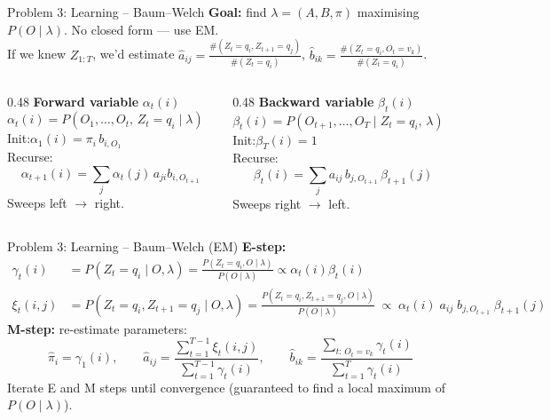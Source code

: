 \documentclass[aspectratio=169,t]{beamer}
\begin{document}
\begin{frame}{Problem 3: Learning -- Baum--Welch}
  \textbf{Goal:} find $\lambda=(A,B,\pi)$ maximising $P(O\mid\lambda)$. No closed form — use EM.\\[0.1cm]
  If we knew $Z_{1:T}$, we'd estimate
  $\hat a_{ij} = \frac{\#(Z_t{=}q_i, Z_{t+1}{=}q_j)}{\#(Z_t{=}q_i)}$,\;
  $\hat b_{ik} = \frac{\#(Z_t{=}q_i, O_t{=}v_k)}{\#(Z_t{=}q_i)}$.\\[0.3cm]
  \begin{columns}[T]
    \begin{column}{0.48\textwidth}
      \textbf{Forward variable} $\alpha_t(i)$\\[0.1cm]
      $\alpha_t(i) = P(O_1,\ldots,O_t,\, Z_t{=}q_i \mid \lambda)$\\[0.2cm]
      Init:\quad $\alpha_1(i)=\pi_i\,b_{i,O_1}$\\[0.15cm]
      Recurse:
      $$\alpha_{t+1}(i)=\sum_j \alpha_t(j)\, a_{ji} b_{i,O_{t+1}}$$
      Sweeps left $\to$ right.
    \end{column}
    \begin{column}{0.48\textwidth}
      \textbf{Backward variable} $\beta_t(i)$\\[0.1cm]
      $\beta_t(i) = P(O_{t+1},\ldots,O_T \mid Z_t{=}q_i,\,\lambda)$\\[0.2cm]
      Init:\quad $\beta_T(i)=1$\\[0.15cm]
      Recurse:
      $$\beta_t(i)=\sum_j a_{ij}\,b_{j,O_{t+1}}\,\beta_{t+1}(j)$$
      Sweeps right $\to$ left.
    \end{column}
  \end{columns}
\end{frame}

\begin{frame}[shrink=3]{Problem 3: Learning -- Baum--Welch (EM)}
    \textbf{E-step:}
    \begin{align*}
      \gamma_t(i) &= P(Z_t = q_i \mid O,\lambda) = \frac{P(Z_t = q_i, O \mid \lambda)}{P(O \mid \lambda)}
      \propto \alpha_t(i) \beta_t(i)\\[4pt]
      \xi_t(i,j)  &= P(Z_t = q_i, Z_{t+1} = q_j \mid O,\lambda) = \frac{P(Z_t = q_i, Z_{t+1} = q_j, O \mid \lambda)}{P(O \mid \lambda)}
                   \;\propto\; \alpha_t(i)\;a_{ij}\;b_{j,O_{t+1}}\;\beta_{t+1}(j)
    \end{align*}
    \textbf{M-step:} re-estimate parameters:
    $$\hat\pi_i = \gamma_1(i), \qquad
      \hat a_{ij} = \frac{\displaystyle\sum_{t=1}^{T-1}\xi_t(i,j)}
                         {\displaystyle\sum_{t=1}^{T-1}\gamma_t(i)}, \qquad
      \hat b_{ik} = \frac{\displaystyle\sum_{t:\,O_t=v_k}\gamma_t(i)}
                         {\displaystyle\sum_{t=1}^{T}\gamma_t(i)}$$
    Iterate E and M steps until convergence (guaranteed to find a local maximum of $P(O\mid\lambda)$).
  \end{frame}
  
\end{document}
